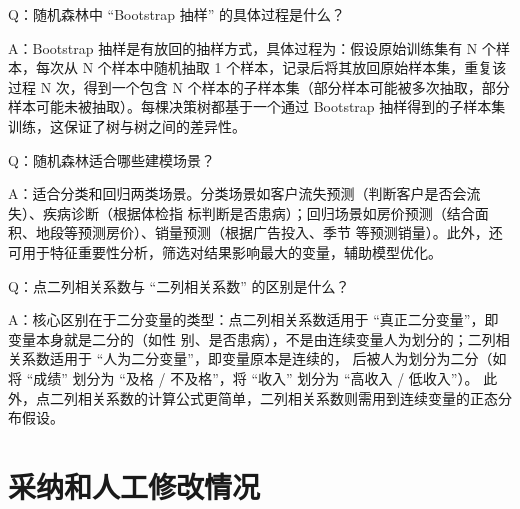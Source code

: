 \documentclass{article}
\begin{document}
Q：随机森林中 “Bootstrap 抽样” 的具体过程是什么？

A：Bootstrap 抽样是有放回的抽样方式，具体过程为：假设原始训练集有 N 个样本，每次从 N 个样本中随机抽取 1 个样本，记录后将其放回原始样本集，重复该过程 N 次，得到一个包含 N 个样本的子样本集（部分样本可能被多次抽取，部分样本可能未被抽取）。每棵决策树都基于一个通过 Bootstrap 抽样得到的子样本集训练，这保证了树与树之间的差异性。

Q：随机森林适合哪些建模场景？

A：适合分类和回归两类场景。分类场景如客户流失预测（判断客户是否会流失）、疾病诊断（根据体检指
标判断是否患病）；回归场景如房价预测（结合面积、地段等预测房价）、销量预测（根据广告投入、季节
等预测销量）。此外，还可用于特征重要性分析，筛选对结果影响最大的变量，辅助模型优化。

Q：点二列相关系数与 “二列相关系数” 的区别是什么？

A：核心区别在于二分变量的类型：点二列相关系数适用于 “真正二分变量”，即变量本身就是二分的（如性
别、是否患病），不是由连续变量人为划分的；二列相关系数适用于 “人为二分变量”，即变量原本是连续的，
后被人为划分为二分（如将 “成绩” 划分为 “及格 / 不及格”，将 “收入” 划分为 “高收入 / 低收入”）。
此外，点二列相关系数的计算公式更简单，二列相关系数则需用到连续变量的正态分布假设。

\section{采纳和人工修改情况}
\end{document}
